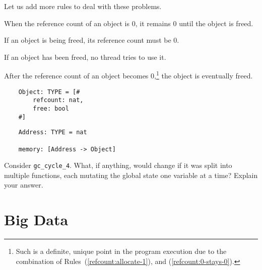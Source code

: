 Let us add more rules to deal with these problems.



\begin{myrule}\label{refcount:0-stays-0}
	When the reference count of an object is 0, it remains 0 until the object is freed.
\end{myrule}

\begin{myrule}\label{refcount:free-implies-0}
	If an object is being freed, its reference count must be 0.
\end{myrule}

\begin{myrule}\label{refcount:use-after-free}
	If an object has been freed, no thread tries to use it.
\end{myrule}

\begin{myrule}\label{refcount:eventual-free}
	After the reference count of an object becomes 0,\footnote{%
		Such is a definite, unique point in the program execution due to the combination of Rules~(\ref{refcount:allocate-1}), and (\ref{refcount:0-stays-0}).
	} the object is eventually freed.
\end{myrule}


\begin{verbatim}
	Object: TYPE = [#
	    refcount: nat,
	    free: bool
	#]
\end{verbatim}

\begin{verbatim}
	Address: TYPE = nat
	
	memory: [Address -> Object]
\end{verbatim}


\begin{exercise}
	Consider \texttt{gc\_cycle\_4}.
	What, if anything, would change if it was split into multiple functions, each mutating the global state one variable at a time?
	Explain your answer.
\end{exercise}

\section{Big Data}\label{sec:big-data}

